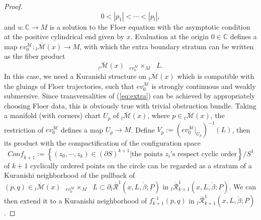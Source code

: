 \documentclass[a4paper]{article}
\numberwithin{equation}{section}
\begin{document}
\begin{proof}
\begin{equation}
0<|p_1|<\cdots<|p_l|,
\end{equation}
and $u:\mathbb{C}\rightarrow M$ is a solution to the Floer equation with the asymptotic condition at the positive cylindrical end given by $x$. Evaluation at the origin $0\in\mathbb{C}$ defines a map $\mathit{ev}_0^\mathcal{M}:{}_l\overline{\mathcal{M}}(x)\rightarrow M$, with which the extra boundary stratum can be written as the fiber product
\begin{equation}\label{eq:extra}
{}_l\overline{\mathcal{M}}(x)\textrm{ }{{}_{\mathit{ev}_0^\mathcal{M}}\times_M}\textrm{ }L.
\end{equation}
In this case, we need a Kuranishi structure on ${}_l\overline{\mathcal{M}}(x)$ which is compatible with the gluings of Floer trajectories, such that $\mathit{ev}_0^\mathcal{M}$ is strongly continuous and weakly submersive. Since transversalities of (\ref{eq:extra}) can be achieved by appropriately choosing Floer data, this is obviously true with trivial obstruction bundle. Taking a manifold (with corners) chart $U_p$ of ${}_l\overline{\mathcal{M}}(x)$, where $p\in{}_l\overline{\mathcal{M}}(x)$, the restriction of $\mathit{ev}_0^\mathcal{M}$ defines a map $U_p\rightarrow M$. Define $V_p:=(\mathit{ev}_0^\mathcal{M}|_{U_p})^{-1}(L)$, then its product with the compactification of the configuration space
\begin{equation}
\mathit{Conf}_{k+1}:=\left\{(z_0,\cdots,z_k)\in(\partial S)^{k+1}|\textrm{the points }z_i\textrm{'s respect cyclic order}\right\}/S^1
\end{equation}
of $k+1$ cyclically ordered points on the circle can be regarded as a stratum of a Kuranishi neighborhood of the pullback of $(p,q)\in{}_l\overline{\mathcal{M}}(x)\textrm{ }{{}_{\mathit{ev}_0^\mathcal{M}}\times_M}\textrm{ }L\subset\partial{}_l\overline{\mathcal{R}}^1(x,L,\ring{\beta};P)$ in ${}_l\overline{\mathcal{R}}_{k+1}^1(x,L,\ring{\beta};P)$. We can then extend it to a Kuranishi neighborhood of $f_{k+1}^{-1}(p,q)$ in ${}_l\overline{\mathcal{R}}_{k+1}^1(x,L,\ring{\beta};P)$.
\end{proof}
\end{document}
